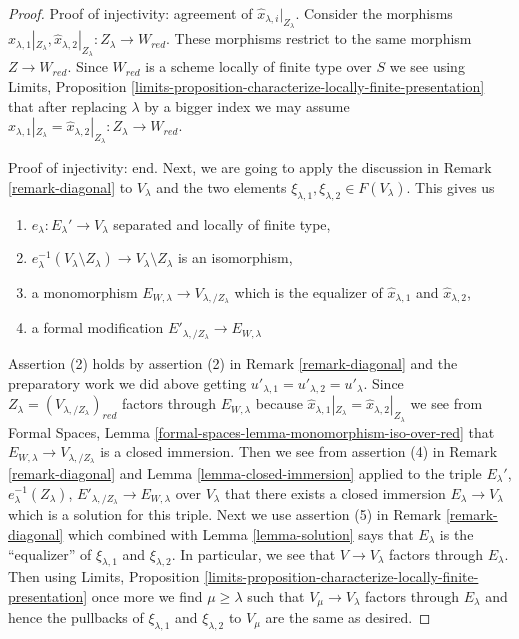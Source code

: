\begin{proof}
\medskip\noindent
Proof of injectivity: agreement of $\hat x_{\lambda, i}|_{Z_\lambda}$.
Consider the morphisms
$\hat x_{\lambda, 1}|_{Z_\lambda}, \hat x_{\lambda, 2}|_{Z_\lambda} :
Z_\lambda \to W_{red}$.
These morphisms restrict to the same morphism $Z \to W_{red}$.
Since $W_{red}$ is a scheme locally of finite type over $S$
we see using Limits, Proposition
\ref{limits-proposition-characterize-locally-finite-presentation}
that after replacing $\lambda$ by a bigger index
we may assume
$\hat x_{\lambda, 1}|_{Z_\lambda} = \hat x_{\lambda, 2}|_{Z_\lambda} :
Z_\lambda \to W_{red}$.

\medskip\noindent
Proof of injectivity: end.
Next, we are going to apply the discussion in
Remark \ref{remark-diagonal} to $V_\lambda$ and the two elements
$\xi_{\lambda, 1}, \xi_{\lambda, 2} \in F(V_\lambda)$.
This gives us
\begin{enumerate}
\item $e_\lambda : E_\lambda' \to V_\lambda$
separated and locally of finite type,
\item $e_\lambda^{-1}(V_\lambda \setminus Z_\lambda) \to
V_\lambda \setminus Z_\lambda$ is an isomorphism,
\item a monomorphism $E_{W, \lambda} \to V_{\lambda, /Z_\lambda}$
which is the equalizer of $\hat x_{\lambda, 1}$ and $\hat x_{\lambda, 2}$,
\item a formal modification $E'_{\lambda, /Z_\lambda} \to E_{W, \lambda}$
\end{enumerate}
Assertion (2) holds by assertion (2) in Remark \ref{remark-diagonal}
and the preparatory work we did above getting
$u'_{\lambda, 1} = u'_{\lambda, 2} = u'_\lambda$.
Since $Z_\lambda = (V_{\lambda, /Z_\lambda})_{red}$ factors through
$E_{W, \lambda}$ because
$\hat x_{\lambda, 1}|_{Z_\lambda} = \hat x_{\lambda, 2}|_{Z_\lambda}$
we see from
Formal Spaces, Lemma \ref{formal-spaces-lemma-monomorphism-iso-over-red}
that $E_{W, \lambda} \to V_{\lambda, /Z_\lambda}$ is a closed immersion.
Then we see from assertion (4) in Remark \ref{remark-diagonal}
and Lemma \ref{lemma-closed-immersion} applied to the triple
$E_\lambda'$, $e_\lambda^{-1}(Z_\lambda)$,
$E'_{\lambda, /Z_\lambda} \to E_{W, \lambda}$ over $V_\lambda$ that
there exists a closed immersion $E_\lambda \to V_\lambda$
which is a solution for this triple.
Next we use assertion (5) in Remark \ref{remark-diagonal}
which combined with Lemma \ref{lemma-solution}
says that $E_\lambda$ is the ``equalizer'' of $\xi_{\lambda, 1}$
and $\xi_{\lambda, 2}$. In particular, we see that $V \to V_\lambda$
factors through $E_\lambda$. Then using Limits, Proposition
\ref{limits-proposition-characterize-locally-finite-presentation}
once more we find $\mu \geq \lambda$ such that $V_\mu \to V_\lambda$
factors through $E_\lambda$ and hence the pullbacks of
$\xi_{\lambda, 1}$ and $\xi_{\lambda, 2}$ to $V_\mu$ are the same
as desired.


\end{proof}
